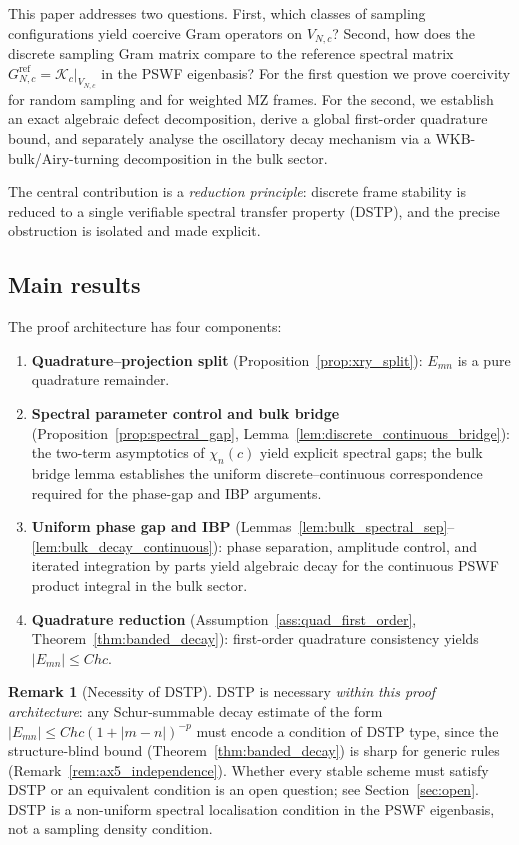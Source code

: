 \documentclass[12pt,a4paper]{amsart}
\theoremstyle{definition}
\newtheorem{remark}[theorem]{Remark}
\newcommand{\Kop}{\mathcal{K}_c}
\begin{document}
This paper addresses two questions. First, which classes of sampling
configurations yield coercive Gram operators on $V_{N,c}$? Second, how
does the discrete sampling Gram matrix compare to the reference spectral
matrix $G^{\mathrm{ref}}_{N,c}=\Kop|_{V_{N,c}}$ in the PSWF
eigenbasis? For the first question we prove coercivity for random
sampling and for weighted MZ frames. For the second, we establish an
exact algebraic defect decomposition, derive a global first-order
quadrature bound, and separately analyse the oscillatory decay mechanism
via a WKB-bulk/Airy-turning decomposition in the bulk sector.

The central contribution is a \emph{reduction principle}: discrete
frame stability is reduced to a single verifiable spectral transfer
property (DSTP), and the precise obstruction is isolated and made
explicit.

\subsection*{Main results}
The proof architecture has four components:
\begin{enumerate}
\item \textbf{Quadrature--projection split}
  (Proposition~\ref{prop:xry_split}): $E_{mn}$ is a pure quadrature
  remainder.
\item \textbf{Spectral parameter control and bulk bridge}
  (Proposition~\ref{prop:spectral_gap},
  Lemma~\ref{lem:discrete_continuous_bridge}): the two-term asymptotics
  of $\chi_n(c)$ yield explicit spectral gaps; the bulk bridge lemma
  establishes the uniform discrete--continuous correspondence required
  for the phase-gap and IBP arguments.
\item \textbf{Uniform phase gap and IBP}
  (Lemmas~\ref{lem:bulk_spectral_sep}--\ref{lem:bulk_decay_continuous}):
  phase separation, amplitude control, and iterated integration by parts
  yield algebraic decay for the continuous PSWF product integral in the
  bulk sector.
\item \textbf{Quadrature reduction}
  (Assumption~\ref{ass:quad_first_order},
  Theorem~\ref{thm:banded_decay}): first-order quadrature consistency
  yields $|E_{mn}|\le Chc$.
\end{enumerate}

\begin{remark}[Necessity of DSTP]\label{rem:dstp_necessity}
DSTP is necessary \emph{within this proof architecture}: any
Schur-summable decay estimate of the form
$|E_{mn}|\le Chc(1+|m-n|)^{-p}$ must encode a condition of DSTP
type, since the structure-blind bound (Theorem~\ref{thm:banded_decay})
is sharp for generic rules (Remark~\ref{rem:ax5_independence}).
Whether every stable scheme must satisfy DSTP or an equivalent
condition is an open question; see Section~\ref{sec:open}.
DSTP is a non-uniform spectral localisation condition in the PSWF
eigenbasis, not a sampling density condition.
\end{remark}
\end{document}
